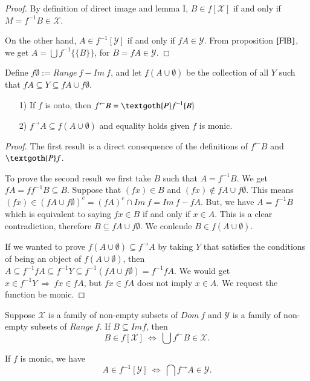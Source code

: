 \documentclass [12pt]{book}
\begin{document}
\begin{proof}By definition of direct image and lemma I, $B\in f[\mathcal{X}]$ if and only if $M=f^{-1}B\in\mathcal{X}$.

On the other hand, $A\in f^{-1}[\mathcal{Y}]$ if and only if $fA\in\mathcal{Y}$. From proposition $\ref{FIB}$, we get $A=\bigcup f^{-1}\{\{B\}\}$, for $B=fA\in\mathcal{Y}$.\end{proof}

Define $f\emptyset:=Range~f-Im~f$, and let $f(A\cup\emptyset)$ be the collection of all $Y$ such that $fA\subseteq Y\subseteq fA\cup f\emptyset$.

\begin{lemma3.3}\makebox[5pt][]{}\mbox {}\begin{itemize}\item[1)]If $f$ is onto, then $f^\leftarrow B=\textgoth{P}f^{-1}\{B\}$\item[2)]$f^\rightarrow A\subseteq f(A\cup\emptyset)$ and equality holds given $f$ is monic.\end{itemize}\end{lemma3.3}

\begin{proof}The first result is a direct consequence of the definitions of $f^\leftarrow B$ and $\textgoth{P}f$.

To prove the second result we first take $B$ such that $A=f^{-1}B$. We get $fA=ff^{-1}B\subseteq B$. Suppose that $(fx)\in B$ and $(fx)\notin fA\cup f\emptyset$. This means $(fx)\in (fA\cup f\emptyset)^c=(fA)^c\cap Im~f=Im~f-fA$. But, we have $A=f^{-1}B$ which is equivalent to saying $fx\in B$ if and only if $x\in A$. This is a clear contradiction, therefore $B\subseteq fA\cup f\emptyset$. We conlcude $B\in f(A\cup\emptyset)$.

If we wanted to prove $f(A\cup\emptyset)\subseteq f^\rightarrow A$ by taking $Y$ that satisfies the conditions of being an object of $f(A\cup\emptyset)$, then $A\subseteq f^{-1}fA\subseteq f^{-1}Y\subseteq f^{-1}(fA\cup f\emptyset)=f^{-1}fA$. We would get $x\in f^{-1}Y~\Rightarrow~fx\in fA$, but $fx\in fA$ does not imply $x\in A$. We request the function be monic.\end{proof}

\begin{theorem}Suppose $\mathcal{X}$ is a family of non-empty subsets of $Dom~f$ and $\mathcal{Y}$ is a family of non-empty subsets of $Range~f$. If $B\subseteq Im f$, then $$B\in f[\mathcal{X}]~\Longleftrightarrow~\bigcup f^\leftarrow B\in\mathcal{X}.$$

If $f$ is monic, we have $$A\in f^{-1}[\mathcal{Y}]~\Longleftrightarrow~\bigcap f^\rightarrow A\in\mathcal{Y}.$$\end{theorem}
\end{document}
